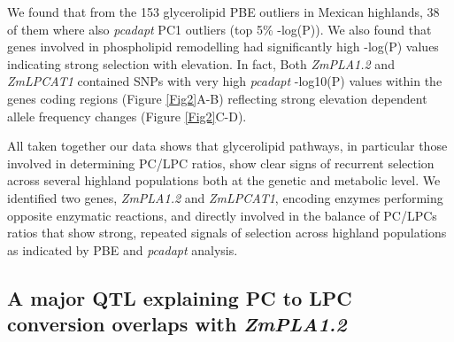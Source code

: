 \documentclass[9pt,twocolumn,twoside,lineno]{BioRxiv}
\begin{document}
We found that from the 153 glycerolipid PBE outliers in Mexican highlands, 38 of them where also \textit{pcadapt} PC1 outliers (top 5\% -log(P)).
We also found that genes involved in phospholipid remodelling had significantly high -log(P) values indicating strong selection with elevation. 
In fact, Both \textit{ZmPLA1.2} and \textit{ZmLPCAT1} contained SNPs with very high \textit{pcadapt} -log10(P) values within the genes coding regions (Figure \ref{Fig2}A-B) reflecting strong elevation dependent allele frequency changes  (Figure \ref{Fig2}C-D).

All taken together our data shows that glycerolipid pathways, in particular those involved in determining PC/LPC ratios, show clear signs of recurrent selection across several highland populations both at the genetic and metabolic level. 
We identified two genes, \textit{ZmPLA1.2} and \textit{ZmLPCAT1}, encoding enzymes performing opposite enzymatic reactions, and directly involved in the balance of PC/LPCs ratios that show strong, repeated signals of selection across highland populations as indicated by PBE and \textit{pcadapt} analysis.

\subsection{A major QTL explaining PC to LPC conversion overlaps with \textit{ZmPLA1.2}} 
\end{document}
